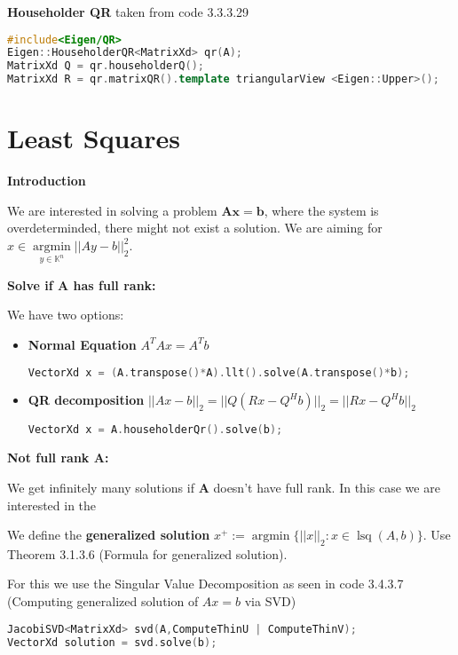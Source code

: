 \documentclass{sciposter}
\renewcommand{\vec}[1]{\mathbf{#1}}
\newcommand{\psection}[1]{\par \textbf{\large#1}}
\begin{document}
\begin{multicols}{2}
\psection{Householder QR}
taken from code 3.3.3.29
\begin{lstlisting}[language=c++]
#include<Eigen/QR>
Eigen::HouseholderQR<MatrixXd> qr(A);
MatrixXd Q = qr.householderQ();
MatrixXd R = qr.matrixQR().template triangularView <Eigen::Upper>();
\end{lstlisting}


\section*{Least Squares}

\psection{Introduction}

We are interested in solving a problem $\vec{A} \vec{x} = \vec{b}$, where the system is overdeterminded, there might not exist a solution. We are aiming for $x \in \operatorname{argmin}\limits_{y\in \mathbb{K}^n} ||Ay - b||_2 ^2$.


\psection{Solve if $\vec{A}$ has full rank:}

We have two options:

\begin{itemize}
	\item \textbf{Normal Equation} $A^T Ax = A^T b$
	\begin{lstlisting}[language=c++]
	VectorXd x = (A.transpose()*A).llt().solve(A.transpose()*b);
	\end{lstlisting}
	\item \textbf{QR decomposition} $||Ax-b||_2 = ||Q(Rx - Q^H b)||_2 = ||Rx - Q^H b||_2$
	\begin{lstlisting}[language=c++]
	VectorXd x = A.householderQr().solve(b);
	\end{lstlisting}
\end{itemize}


\psection{Not full rank $\vec{A}$:}

We get infinitely many solutions if $\vec{A}$ doesn't have full rank. In this case we are interested in the 

\begin{mdframed}
	We define the \textbf{generalized solution} $x^+ := \operatorname{argmin}\{ ||x||_2 : x\in \operatorname{lsq}(A,b)\}$. Use Theorem 3.1.3.6 (Formula for generalized solution).
\end{mdframed}

For this we use the Singular Value Decomposition as seen in code 3.4.3.7 (Computing generalized solution of $Ax=b$ via SVD)


\begin{lstlisting}[language=c++]
JacobiSVD<MatrixXd> svd(A,ComputeThinU | ComputeThinV);
VectorXd solution = svd.solve(b);
\end{lstlisting}


\end{multicols}
\end{document}
